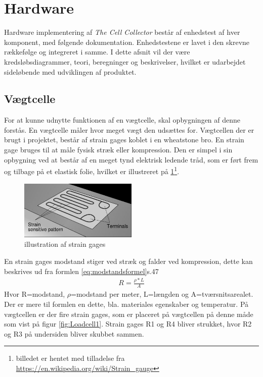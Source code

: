   \section{Hardware}
  Hardware implementering af \textit{The Cell Collector} består af enhedstest af hver komponent, med følgende dokumentation. Enhedstestene er lavet i den skrevne rækkefølge og integreret i samme. I dette afsnit vil der være kredsløbsdiagrammer, teori, beregninger og beskrivelser, hvilket er udarbejdet sideløbende med udviklingen af produktet. 
 	
 \subsection{Vægtcelle}
 For at kunne udnytte funktionen af en vægtcelle, skal opbygningen af denne forstås. En vægtcelle måler hvor meget vægt den udsættes for. Vægtcellen der er brugt i projektet, består af strain gages koblet i en wheatstone bro. En strain gage bruges til at måle fysisk stræk eller kompression. Den er simpel i sin opbygning ved at består af en meget tynd elektrisk ledende tråd, som er ført frem og tilbage på et elastisk folie, hvilket er illustreret på \ref{fig:Strain gages}\footnote{billedet er hentet med tilladelse fra  \url{https://en.wikipedia.org/wiki/Strain_gauge}}. 
 \begin{figure}[H]
	\centering
	\includegraphics[width=0.5\textwidth]{billeder/Hardware/straingages1.JPG}
	\caption{illustration af strain gages}
	\label{fig:Strain gages}
\end{figure}
En strain gages modstand stiger ved stræk og falder ved kompression, dette kan beskrives ud fra formlen \ref{eq:modstandsformel}\citep{Websterbog}{s.47}
 \begin{align}
 R=\frac{\rho*L}{A}
 \label{eq:modstandsformel}
 \end{align}
 Hvor R=modstand, $\rho$=modstand per meter, L=længden og A=tværsnitsarealet. Der er mere til formlen en dette, bla. materiales egenskaber og temperatur. På vægtcellen er der fire strain gages, som er placeret på vægtcellen på denne måde som vist på figur \ref{fig:Loadcell1}. Strain gages R1 og R4 bliver strukket, hvor R2 og R3 på undersiden bliver skubbet sammen.
 
